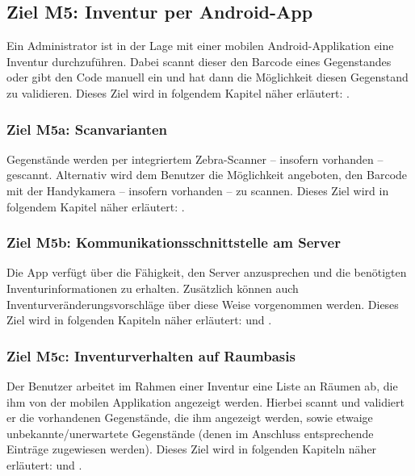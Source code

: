 \documentclass[
    headings=optiontotocandhead,%
    twoside,
    numbers=noenddot,%
    toc=flat, %
    12pt, %
    titlepage, %
    parskip=full, %
    listof=totoc, %
    listof=flat, %
    numbers=noenddot, %
    bibliography=totoc, %
    a4paper,DIV=14,
    BCOR=15mm,
]{scrbook}
\begin{document}
      \subsection*{Ziel M5: Inventur per Android-App}

      Ein Administrator ist in der Lage mit einer mobilen Android-Applikation eine Inventur durchzuführen. Dabei scannt dieser den Barcode eines Gegenstandes oder gibt den Code manuell ein und hat dann die Möglichkeit diesen Gegenstand zu validieren. 
      Dieses Ziel wird in folgendem Kapitel näher erläutert: .
      
    
      \subsubsection*{Ziel M5a: Scanvarianten}

        Gegenstände werden per integriertem Zebra-Scanner – insofern vorhanden – gescannt. Alternativ wird dem Benutzer die Möglichkeit angeboten, den Barcode mit der Handykamera – insofern vorhanden – zu scannen. 
        Dieses Ziel wird in folgendem Kapitel näher erläutert: .
      
        \subsubsection*{Ziel M5b: Kommunikationsschnittstelle am Server}

        Die App verfügt über die Fähigkeit, den Server anzusprechen und die benötigten Inventurinformationen zu erhalten. Zusätzlich können auch Inventurveränderungsvorschläge über diese Weise vorgenommen werden.
        Dieses Ziel wird in folgenden Kapiteln näher erläutert:  und .
        
        \subsubsection*{Ziel M5c: Inventurverhalten auf Raumbasis}

        Der Benutzer arbeitet im Rahmen einer Inventur eine Liste an Räumen ab, die ihm von der mobilen Applikation angezeigt werden. Hierbei scannt und validiert er die vorhandenen Gegenstände, die ihm angezeigt werden, sowie etwaige unbekannte/unerwartete Gegenstände (denen im Anschluss entsprechende Einträge zugewiesen werden).
        Dieses Ziel wird in folgenden Kapiteln näher erläutert:  und .
     
\end{document}
